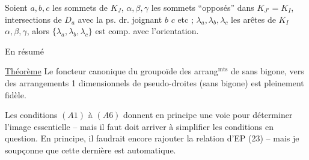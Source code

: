 Soient $a,b,c$ les sommets de $K_J$, $\alpha,\beta,\gamma$
les sommets ``opposés'' dans $K_{J'}=K_I$, intersections
de $D_a$ avec la ps. dr. joignant $b$  $c$ etc ;
 $\lambda_a,\lambda_b,\lambda_c$ les arêtes de $K_I$ 
$\alpha,\beta,\gamma$, alors $\{\lambda_a,\lambda_b,\lambda_c\}$ est comp. avec
l'orientation.

En résumé

\uline{Théorème} Le foncteur canonique
du groupoïde des arrang$^{\mathrm{mts}}$ de
 sans bigone, vers  des arrangements
1 dimensionnels de pseudo-droites (sans
bigone) est pleinement fidèle.

Les conditions $(A1)$ à $(A6)$ donnent
en principe une voie pour déterminer
l'image essentielle -- mais il faut 
doit arriver à simplifier les conditions
en question. En principe, il faudrait
encore rajouter la relation d'EP (23) --
mais je soupçonne que cette dernière
est automatique.
